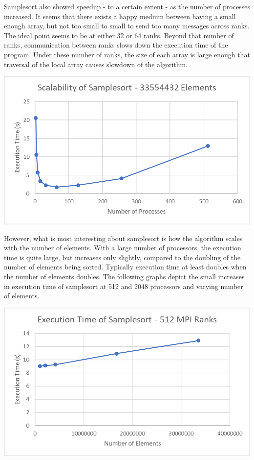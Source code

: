 \documentclass[10pt,letterpaper]{article}
\begin{document}
\begin{multicols}{2}
Samplesort also showed speedup - to a certain extent - as the number of processes increased. It seems that there exists a happy medium between having a small enough array, but not too small to small to send too many messages across ranks. The ideal point seems to be at either 32 or 64 ranks. Beyond that number of ranks, communication between ranks slows down the execution time of the program. Under these number of ranks, the size of each array is large enough that traversal of the local array causes slowdown of the algorithm.

\begin{center}
\includegraphics[scale=1]{samplesort_33554432}
\end{center}

However, what is most interesting about samplesort is how the algorithm scales with the number of elements. With a large number of processors, the execution time is quite large, but increases only slightly, compared to the doubling of the number of elements being sorted. Typically execution time at least doubles when the number of elements doubles. The following graphs depict the small increases in execution time of samplesort at 512 and 2048 processors and varying number of elements.

\begin{center}
\includegraphics[scale=1]{samplesort_512}
\end{center}


\end{multicols}
\end{document}
